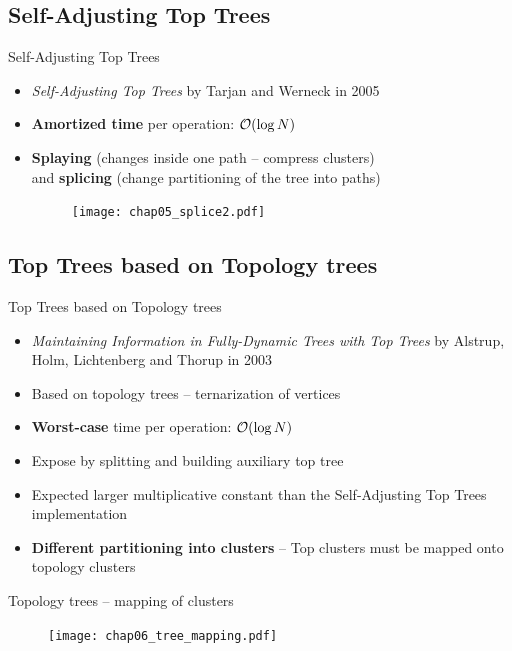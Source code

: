 \documentclass{beamer}				%
\begin{document}
\subsection{Self-Adjusting Top Trees}
\begin{frame}{Self-Adjusting Top Trees}

\begin{itemize}
\item {\it Self-Adjusting Top Trees} by Tarjan and Werneck in 2005
\pause
\item {\bf Amortized time} per operation: ${\cal O}(\log N)$
\bigskip\pause
\item {\bf Splaying} (changes inside one path -- compress clusters)\\ and {\bf
splicing} (change partitioning of the tree into paths)
	\smallskip
	\begin{figure}
	\centering
	\texttt{[image: chap05\_splice2.pdf]}
	\end{figure}
\end{itemize}

\end{frame}


\subsection{Top Trees based on Topology trees}
\begin{frame}{Top Trees based on Topology trees}

\begin{itemize}
\item {\it Maintaining Information in Fully-Dynamic Trees with Top Trees} by
Alstrup, Holm, Lichtenberg and Thorup in 2003
\bigskip\pause
\item Based on topology trees -- ternarization of vertices
\item {\bf Worst-case} time per operation: ${\cal O}(\log N)$
\pause\item Expose by splitting and building auxiliary top tree
\pause\item Expected larger multiplicative constant than the Self-Adjusting Top Trees implementation
\bigskip\pause
\item {\bf Different partitioning into clusters} -- Top clusters must be mapped onto topology clusters
\end{itemize}

\end{frame}

\begin{frame}{Topology trees -- mapping of clusters}
	\begin{figure}
	\centering
	\texttt{[image: chap06\_tree\_mapping.pdf]}
	\end{figure}
\end{frame}
\end{document}
